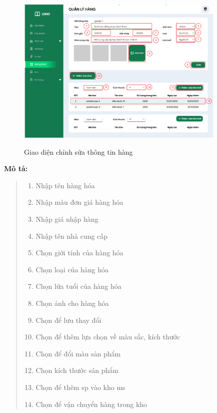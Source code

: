             \begin{figure}[!htp]
                \centering
                \includegraphics[width=10cm]{img/UI/admin/Goods_edit.png}
                \label{38}
                \newline
                \caption{Giao diện chỉnh sửa thông tin hàng}
            \end{figure}
            \textbf{Mô tả:}  
            \begin{quote}
                \begin{enumerate}
                    \item Nhập tên hàng hóa
                    \item Nhập màu đơn giá hàng hóa
                    \item Nhập giá nhập hàng
                    \item Nhập tên nhà cung cấp
                    \item Chọn giới tính của hàng hóa
                    \item Chọn loại của hàng hóa
                    \item Chọn lứa tuổi của hàng hóa
                    \item Chọn ảnh cho hàng hóa
                    \item Chọn để lưu thay đổi
                    \item Chọn để thêm lựa chọn về màu sắc, kích thước
                    \item Chọn để đổi màu sản phẩm
                    \item Chọn kích thước sản phẩm
                    \item Chọn để thêm sp vào kho ms
                    \item Chọn để vận chuyển hàng trong kho
                \end{enumerate}
            \end{quote}
            
